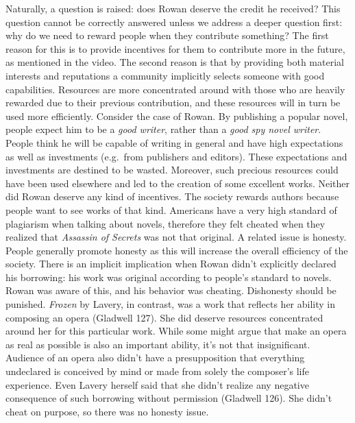 \documentclass{writing}
\begin{document}
Naturally, a question is raised: does Rowan deserve the credit he
received? This question cannot be correctly answered unless we address a
deeper question first: why do we need to reward people when they
contribute something? The first reason for this is to provide incentives
for them to contribute more in the future, as mentioned in the video.
The second reason is that by providing both material interests and
reputations a community implicitly selects someone with good
capabilities. Resources are more concentrated around with those who are
heavily rewarded due to their previous contribution, and these resources
will in turn be used more efficiently. Consider the case of Rowan. By
publishing a popular novel, people expect him to be a \emph{good
writer}, rather than a \emph{good spy novel writer}. People think he
will be capable of writing in general and have high expectations as well
as investments (e.g.~from publishers and editors). These expectations
and investments are destined to be wasted. Moreover, such precious
resources could have been used elsewhere and led to the creation of some
excellent works. Neither did Rowan deserve any kind of incentives. The
society rewards authors because people want to see works of that kind.
Americans have a very high standard of plagiarism when talking about
novels, therefore they felt cheated when they realized that
\emph{Assassin of Secrets} was not that original. A related issue is
honesty. People generally promote honesty as this will increase the
overall efficiency of the society. There is an implicit implication when
Rowan didn't explicitly declared his borrowing: his work was original
according to people's standard to novels. Rowan was aware of this, and
his behavior was cheating. Dishonesty should be punished. \emph{Frozen}
by Lavery, in contrast, was a work that reflects her ability in
composing an opera (Gladwell 127). She did deserve resources
concentrated around her for this particular work. While some might argue
that make an opera as real as possible is also an important ability,
it's not that insignificant. Audience of an opera also didn't have a
presupposition that everything undeclared is conceived by mind or made
from solely the composer's life experience. Even Lavery herself said
that she didn't realize any negative consequence of such borrowing
without permission (Gladwell 126). She didn't cheat on purpose, so there
was no honesty issue.
\end{document}

